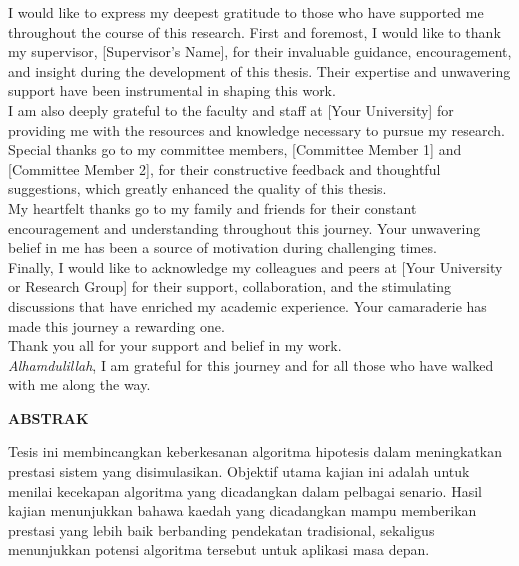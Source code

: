 I would like to express my deepest gratitude to those who have supported me throughout the course of this research. First and foremost, I would like to thank my supervisor, [Supervisor's Name], for their invaluable guidance, encouragement, and insight during the development of this thesis. Their expertise and unwavering support have been instrumental in shaping this work.\\

I am also deeply grateful to the faculty and staff at [Your University] for providing me with the resources and knowledge necessary to pursue my research. Special thanks go to my committee members, [Committee Member 1] and [Committee Member 2], for their constructive feedback and thoughtful suggestions, which greatly enhanced the quality of this thesis.\\

My heartfelt thanks go to my family and friends for their constant encouragement and understanding throughout this journey. Your unwavering belief in me has been a source of motivation during challenging times.\\

Finally, I would like to acknowledge my colleagues and peers at [Your University or Research Group] for their support, collaboration, and the stimulating discussions that have enriched my academic experience. Your camaraderie has made this journey a rewarding one.\\

Thank you all for your support and belief in my work.\\

\textit{Alhamdulillah}, I am grateful for this journey and for all those who have walked with me along the way.



\clearpage


\noindent
\begin{center}
    \vspace*{0mm} %
    {\fontsize{12pt}{14pt}\selectfont \textbf{ABSTRAK}}
\end{center}

\vspace{10mm} %

\noindent
Tesis ini membincangkan keberkesanan algoritma hipotesis dalam meningkatkan prestasi sistem yang disimulasikan. Objektif utama kajian ini adalah untuk menilai kecekapan algoritma yang dicadangkan dalam pelbagai senario. Hasil kajian menunjukkan bahawa kaedah yang dicadangkan mampu memberikan prestasi yang lebih baik berbanding pendekatan tradisional, sekaligus menunjukkan potensi algoritma tersebut untuk aplikasi masa depan.

